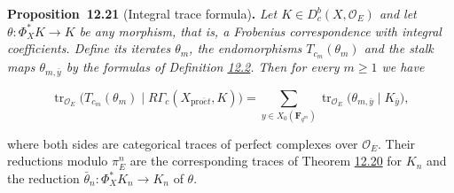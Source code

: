 \documentclass[11pt]{article}
\newenvironment{bpstatement}[2]{\par\addvspace{0.6\baselineskip}\noindent\textbf{#1}#2\textbf{.}\enspace\ignorespaces}
  {\par\addvspace{0.4\baselineskip}}
\newenvironment{bpstatementit}[2]{\begin{bpstatement}{#1}{#2}\itshape\ignorespaces}{\end{bpstatement}}
\providecommand{\Dbc}{}\renewcommand{\Dbc}{D^b_c}
\begin{document}
\label{bp291}%
\begin{bpstatementit}{Proposition~12.21}{ (Integral trace formula)}
Let \(K\in\Dbc(X,\mathcal O_E)\) and let \(\theta:\Phi_X^*K\to K\) be any morphism, that is, a Frobenius correspondence with integral coefficients. Define its iterates \(\theta_m\), the endomorphisms \(T_{c_m}(\theta_m)\) and the stalk maps \(\theta_{m,\bar y}\) by the formulas of Definition \hyperref[bp232]{12.2}. Then for every \(m\geq1\) we have

\[
\operatorname{tr}_{\mathcal O_E}
\bigl(T_{c_m}(\theta_m)\mid R\Gamma_c(X_{\mathrm{pro}\acute{e}t},K)\bigr)
=\sum_{y\in X_0(\mathbf F_{q^m})}
\operatorname{tr}_{\mathcal O_E}
\bigl(\theta_{m,\bar y}\mid K_{\bar y}\bigr),
\tag{12.1}
\]

where both sides are categorical traces of perfect complexes over \(\mathcal O_E\). Their reductions modulo \(\pi_E^n\) are the corresponding traces of Theorem \hyperref[bp287]{12.20} for \(K_n\) and the reduction \(\bar\theta_n:\Phi_X^*K_n\to K_n\) of \(\theta\).
\end{bpstatementit}
\end{document}
